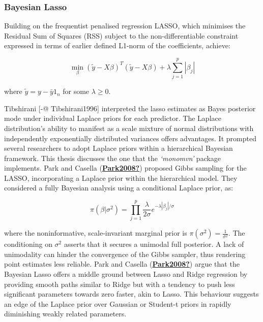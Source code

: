 \documentclass[
  11pt,
]{article}
\begin{document}
\subsubsection{Bayesian Lasso}

Building on the frequentist penalised regression LASSO, which minimises
the Residual Sum of Squares (RSS) subject to the non-differentiable
constraint expressed in terms of earlier defined L1-norm of the
coefficients, achieve:

\begin{equation}
\min_{\beta} \left(\tilde{y} - X\beta \right)^T \left(\tilde{y} - X\beta \right) + \lambda \sum_{j=1}^{p} |\beta_j|
\end{equation}

where \(\tilde{y} = y - \bar{y}1_n\) for some \(\lambda \geq 0\).

Tibshirani {[}-@ Tibshirani1996{]} interpreted the lasso estimates as
Bayes posterior mode under individual Laplace priors for each predictor.
The Laplace distribution's ability to manifest as a scale mixture of
normal distributions with independently exponentially distributed
variances offers advantages. It prompted several researchers to adopt
Laplace priors within a hierarchical Bayesian framework. This thesis
discusses the one that the \emph{`monomvn'} package implements. Park and
Casella (\protect\hyperlink{ref-Park2008}{\textbf{Park2008?}}) proposed
Gibbs sampling for the LASSO, incorporating a Laplace prior within the
hierarchical model. They considered a fully Bayesian analysis using a
conditional Laplace prior, as:

\begin{equation}
\pi(\beta|\sigma^2) = \prod_{j=1}^{p} \frac{\lambda}{2\sigma} e^{-\lambda|\beta_j|/\sigma}
\end{equation}

where the noninformative, scale-invariant marginal prior is
\(\pi(\sigma^2) = \frac{1}{\sigma^2}\). The conditioning on \(\sigma^2\)
asserts that it secures a unimodal full posterior. A lack of unimodality
can hinder the convergence of the Gibbs sampler, thus rendering point
estimates less reliable. Park and Casella
(\protect\hyperlink{ref-Park2008}{\textbf{Park2008?}}) argue that the
Bayesian Lasso offers a middle ground between Lasso and Ridge regression
by providing smooth paths similar to Ridge but with a tendency to push
less significant parameters towards zero faster, akin to Lasso. This
behaviour suggests an edge of the Laplace prior over Gaussian or
Student-t priors in rapidly diminishing weakly related parameters.
\end{document}
